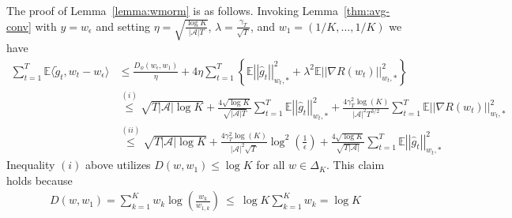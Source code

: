 \documentclass[11pt,letterpaper]{article}
\newcommand{\Exs}{\mathbb{E}}
\newcommand{\weps}{w_{\epsilon}}
\newcommand{\numactions}{|\mathcal{A}|}
\theoremstyle{plain}
\theoremstyle{definition}  %
\begin{document}
\noindent The proof of Lemma~\ref{lemma:wmorm} is as follows.
Invoking Lemma~\ref{thm:avg-conv} with $y = \weps$ and setting  $\eta = \sqrt{\frac{\log K}{ \numactions T}}$, $\lambda = \frac{\gamma_T}{\sqrt{T}}$, and $w_1 = (1/K, \ldots, 1/K)$ we have 
%
\begin{align}
    \sum_{t=1}^T \Exs\langle \tilde{g}_t , w_t - \weps \rangle  
    &\leq \frac{D_\phi(\weps, w_1)}{\eta } + 
    4\eta \sum_{t = 1}^T \left\lbrace 
     \Exs \left|\left|\widehat{g}_t\right|\right|_{w_t,\ast}^2 + \lambda^2\Exs \left|\left|\nabla R(w_t)\right|\right|_{w_t,\ast}^2 \right\rbrace \nonumber  \\ 
     &\stackrel{(i)}{\leq} \sqrt{T\numactions \log K} + \frac{4\sqrt{\log K}}{\sqrt{\numactions T}} 
     \sum_{t = 1}^T  
     \Exs \left|\left|\widehat{g}_t\right|\right|_{w_t,\ast}^2 
     + \frac{4\gamma^2_T \log(K) }{ \numactions^2 T^{3/2}}  \sum_{t = 1}^T \Exs \left|\left|\nabla R(w_t)\right|\right|_{w_t,\ast}^2 \nonumber \\
     &\stackrel{(ii)}{\leq} 
     \sqrt{T\numactions \log K} +
     \frac{4\gamma^2_T \log(K) }{ \numactions^2 \sqrt{T}}  \log^2\left( \frac{1}{\epsilon} \right)
      + 
      \frac{4\sqrt{\log K}}{\sqrt{T \numactions}}  \sum_{t = 1}^T \Exs \left|\left|\widehat{g}_t\right|\right|_{w_t,\ast}^2 
     \label{eqn:bound-2}
\end{align}
%
Inequality $(i)$ above utilizes  $D(w, w_1) \leq \log K$ for all $w \in \Delta_K$. This claim holds because
\begin{align*}
    D(w,w_1) = \sum^K_{k = 1} w_k \log \left( \frac{w_k}
    {w_{1,k}}\right)
    \ \leq \ \log K \sum^K_{k = 1} w_k = \log K
\end{align*}
\end{document}
